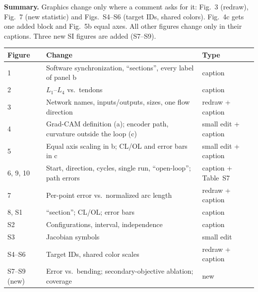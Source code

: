 \documentclass[10pt,a4paper]{article}
\begin{document}
\textbf{Summary.} Graphics change only where a comment asks for it: Fig.~3 (redraw), Fig.~7 (new statistic) and Figs.~S4--S6 (target IDs, shared colors). Fig.~4c gets one added block and Fig.~5b equal axes. All other figures change only in their captions. Three new SI figures are added (S7--S9).

\small
\begin{tabularx}{\linewidth}{lXl}
\toprule
Figure & Change & Type\\\midrule
1 & Software synchronization, ``sections'', every label of panel b & caption\\
2 & $L_1$--$L_4$ vs.\ tendons & caption\\
3 & Network names, inputs/outputs, sizes, one flow direction & redraw + caption\\
4 & Grad-CAM definition (a); encoder path, curvature outside the loop (c) & small edit + caption\\
5 & Equal axis scaling in b; CL/OL and error bars in c & small edit + caption\\
6, 9, 10 & Start, direction, cycles, single run, ``open-loop''; path errors & caption + Table~S7\\
7 & Per-point error vs.\ normalized arc length & redraw + caption\\
8, S1 & ``section''; CL/OL; error bars & caption\\
S2 & Configurations, interval, independence & caption\\
S3 & Jacobian symbols & small edit\\
S4--S6 & Target IDs, shared color scales & redraw + caption\\
S7--S9 (new) & Error vs.\ bending; secondary-objective ablation; coverage & new\\
\bottomrule
\end{tabularx}
\normalsize

\end{document}
